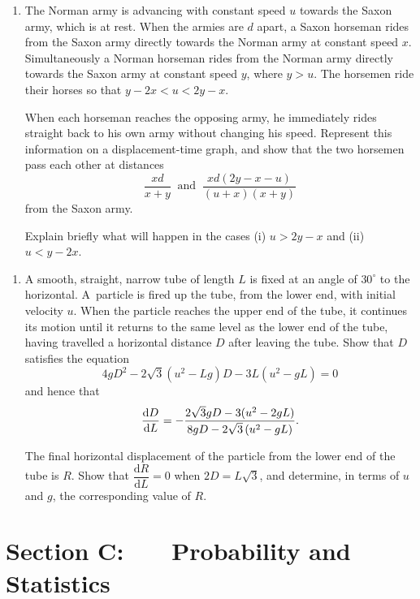 \documentclass[a4, 11pt]{report}
\newlength{\qspace}
\newcounter{qnumber}
\newenvironment{question}%
 {\vspace{\qspace}
  \begin{enumerate}[\bfseries 1\quad][10]%
    \setcounter{enumi}{\value{qnumber}}%
    \item%
 }
{
  \end{enumerate}
  \filbreak
  \stepcounter{qnumber}
 }
\def\d{{\mathrm d}}
\begin{document}
\begin{question}	
The Norman army is advancing with constant speed $u$
towards the Saxon army, which is at rest.
When the armies are $d$ apart, a Saxon horseman rides from
the Saxon army directly towards the Norman army
at constant speed $x$.
Simultaneously a Norman horseman rides from the Norman
army directly towards the Saxon army at constant speed $y$, where $y >
u$. 
The horsemen ride their horses so that $y - 2x < u < 2y - x$.


When each horseman reaches the opposing army,
he immediately rides straight back to his own army
without changing his speed. Represent this information
on a displacement-time graph, and show that the two
horsemen pass each other at distances
\[
\frac{xd }{ x + y} \;\;
\mbox{and} \;\; \frac{xd(2y -x-u)}
{(u+x ) ( x + y )}
\]
from the Saxon army.


Explain briefly what will happen in the cases
(i) $u > 2y - x$
and (ii) $u < y - 2x$.
\end{question}


\begin{question}
A smooth, straight, narrow tube of length $L$
 is fixed at an angle of $30^\circ$ to the horizontal.
A~particle is fired up the tube, from the lower end,
with initial velocity $u$.
When the particle reaches the upper end of the tube,
it continues its motion until it returns to the same
level as the lower end of the tube, having travelled 
a horizontal distance $D$ after leaving the tube.
Show that $D$ satisfies the equation
\[
4gD^2 - 2 \sqrt{3} \left( u^2 - Lg \right)D
- 3L \left( u^2 - gL \right) = 0
\]
and hence that 
\[ 
\frac{{\rm d}D}{ {\rm d}L}
= - \frac{ 2\sqrt{3}gD - 3(u^2-2gL)}
{ 8gD - 2 \sqrt{3} \left(u^2 - gL \right)}.
\]



The final  horizontal displacement 
of the particle from the lower end of the tube is $R$. 
Show that $\dfrac{\d R}{\d L} = 0$ when $2D = L \sqrt 3$, 
and determine, in terms of $u$ and $g$,
 the corresponding value of $R$.
\end{question}
	

	
	\newpage
\section*{Section C: \ \ \ Probability and Statistics}
\end{document}
